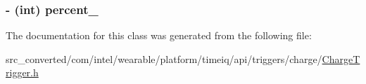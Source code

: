 \subsubsection[{percent\+\_\+}]{\setlength{\rightskip}{0pt plus 5cm}-\/ (int) percent\+\_\+}\label{interface_charge_trigger___charge_trigger_builder_a16534ce3fa19580bff7b1d20857bd322}


The documentation for this class was generated from the following file\+:\begin{DoxyCompactItemize}
\item 
src\+\_\+converted/com/intel/wearable/platform/timeiq/api/triggers/charge/\hyperlink{_charge_trigger_8h}{Charge\+Trigger.\+h}\end{DoxyCompactItemize}
